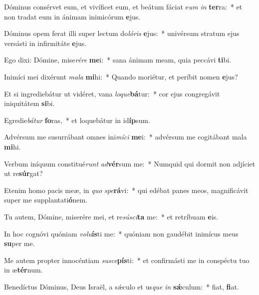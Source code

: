 \item Dóminus consérvet eum, et vivíficet eum, et beátum fáciat e\textit{um} \textit{in} \textbf{ter}ra:~* et non tradat eum in ánimam inimicórum \textbf{e}jus.
\item Dóminus opem ferat illi super lectum do\textit{ló}\textit{ris} \textbf{e}jus:~* univérsum stratum ejus versásti in infirmitáte \textbf{e}jus.
\item Ego dixi: Dómine, mise\textit{ré}\textit{re} \textbf{me}i:~* sana ánimam meam, quia peccávi \textbf{ti}bi.
\item Inimíci mei dixérunt \textit{ma}\textit{la} \textbf{mi}hi:~* Quando moriétur, et períbit nomen \textbf{e}jus?
\item Et si ingrediebátur ut vidéret, vana \textit{lo}\textit{que}\textbf{bá}tur:~* cor ejus congregávit iniquitátem \textbf{si}bi.
\item Egredie\textit{bá}\textit{tur} \textbf{fo}ras,~* et loquebátur in id\textbf{íp}sum.
\item Advérsum me susurrábant omnes ini\textit{mí}\textit{ci} \textbf{me}i:~* advérsum me cogitábant mala \textbf{mi}hi.
\item Verbum iníquum constitué\textit{runt} \textit{ad}\textbf{vér}sum me:~* Numquid qui dormit non adjíciet ut re\textbf{súr}gat?
\item Etenim homo pacis meæ, in \textit{quo} \textit{spe}\textbf{rá}vi:~* qui edébat panes meos, magnificávit super me supplantati\textbf{ó}nem.
\item Tu autem, Dómine, miserére mei, et re\textit{sú}\textit{sci}\textbf{ta} me:~* et retríbuam \textbf{e}is.
\item In hoc cognóvi quóniam \textit{vo}\textit{lu}\textbf{ís}ti me:~* quóniam non gaudébit inimícus meus \textbf{su}per me.
\item Me autem propter innocéntiam \textit{su}\textit{sce}\textbf{pís}ti:~* et confirmásti me in conspéctu tuo in æ\textbf{tér}num.
\item Benedíctus Dóminus, Deus Israël, a sǽculo et us\textit{que} \textit{in} \textbf{sǽ}culum:~* fiat, \textbf{fi}at.
